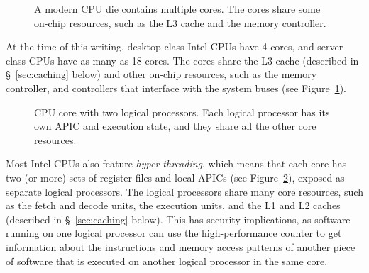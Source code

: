 \begin{figure}[hbt]
  \caption{
    A modern CPU die contains multiple cores. The cores share some on-chip
    resources, such as the L3 cache and the memory controller.
  }
  \label{fig:cpu_die}
\end{figure}

At the time of this writing, desktop-class Intel CPUs have 4 cores, and
server-class CPUs have as many as 18 cores. The cores share the L3 cache
(described in \S~\ref{sec:caching} below) and other on-chip resources, such as
the memory controller, and controllers that interface with the system buses
(see Figure~\ref{fig:cpu_die}).

\begin{figure}[hbt]
  \caption{
    CPU core with two logical processors. Each logical processor has its own
    APIC and execution state, and they share all the other core resources.
  }
  \label{fig:cpu_core}
\end{figure}

Most Intel CPUs also feature \textit{hyper-threading}, which means that each
core has two (or more) sets of register files and local APICs (see
Figure~\ref{fig:cpu_core}), exposed as separate logical processors. The
logical processors share many core resources, such as the fetch and decode
units, the execution units, and the L1 and L2 caches (described in
\S~\ref{sec:caching} below). This has security implications, as software
running on one logical processor can use the high-performance counter
\cite{petters1999making} to get information about the instructions and memory
access patterns of another piece of software that is executed on another
logical processor in the same core.


